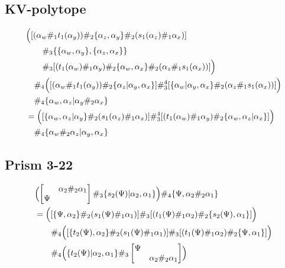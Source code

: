 \documentclass[11pt, reqno]{amsart} %
\theoremstyle{definition}
\theoremstyle{remark}
\numberwithin{equation}{section}
\begin{document}
\subsection{KV-polytope}
\begin{align}
  \nonumber
  &
  \Bigl(
    [(\alpha_w\#_1t_1(\alpha_y))\#_2\{\alpha_z,\alpha_y\}\#_2(s_1(\alpha_z)\#_1\alpha_x)] \\
    \nonumber
    &\qquad \#_3
    \{\{\alpha_w,\alpha_y\},\{\alpha_z,\alpha_x\}\} \\
    \nonumber
    &\qquad \#_3
    [(t_1(\alpha_w)\#_1\alpha_y)\#_2\{\alpha_w,\alpha_x\}\#_2(\alpha_z\#_1s_1(\alpha_x))]
  \Bigr) \\
  \nonumber
  & \quad \#_4
  \Bigl(
    [(\alpha_w\#_1t_1(\alpha_y))\#_2\{\alpha_z|\alpha_y,\alpha_x\}]
    \#^4_3
    [\{\alpha_w|\alpha_y,\alpha_x\}\#_2(\alpha_z\#_1s_1(\alpha_x))]
  \Bigr) \\
  \nonumber
  & \quad \#_4 
  \{\alpha_w,\alpha_z|\alpha_y\#_2\alpha_x\} \\
  \nonumber
  &= 
  \Bigl(
    [\{\alpha_w,\alpha_z|\alpha_y\}\#_2(s_1(\alpha_z)\#_1\alpha_x)]
    \#^4_3
    [(t_1(\alpha_w)\#_1\alpha_y)\#_2\{\alpha_w,\alpha_z|\alpha_x\}]
  \Bigr) \\
  \label{eq:KV-poly}
  &\quad \#_4 
  \{\alpha_w\#_2\alpha_z|\alpha_y,\alpha_x\}
\end{align}

\subsection{Prism 3-22}
\begin{align}
  \nonumber
  &
  \Bigl(
    \begin{bmatrix} & \alpha_2\#_2\alpha_1 \\ \Psi &\end{bmatrix}
    \#_3
    \{s_2(\Psi)|\alpha_2,\alpha_1\}
  \Bigr)
  \#_4
  \{\Psi,\alpha_2\#_2\alpha_1\} \\
  \nonumber
  &= 
  \Bigl(
    [\{\Psi,\alpha_2\}\#_2(s_1(\Psi)\#_1\alpha_1)]
    \#_3
    [(t_1(\Psi)\#_1\alpha_2)\#_2\{s_2(\Psi),\alpha_1\}]
  \Bigr) \\
  \nonumber
  &\qquad \#_4
  \Bigl(
  [\{t_2(\Psi),\alpha_2\}\#_2(s_1(\Psi)\#_1\alpha_1)]
  \#_3
  [(t_1(\Psi)\#_1\alpha_2)\#_2\{\Psi,\alpha_1\}]
  \Bigr) \\
  \label{eq:Prism3|22}
  &\qquad \#_4
  \Bigl(
    \{t_2(\Psi)|\alpha_2,\alpha_1\}
    \#_3
    \begin{bmatrix}\Psi & \\ & \alpha_2\#_2\alpha_1\end{bmatrix}
  \Bigr)
\end{align}
\end{document}

